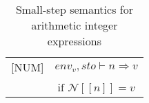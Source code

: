 \begin{table}[H]
    \centering
    \begin{longtable}[c] { r c }
        
        [NUM] & \( env_v,sto \vdash n \Rightarrow v \) 
         \\ \\
        & 
       \( \text{if } \mathcal{N} [[n]] = v \) \\
        
    \end{longtable}
    \caption{Small-step semantics for arithmetic integer expressions}\label{tab:sss_aud}
\end{table}